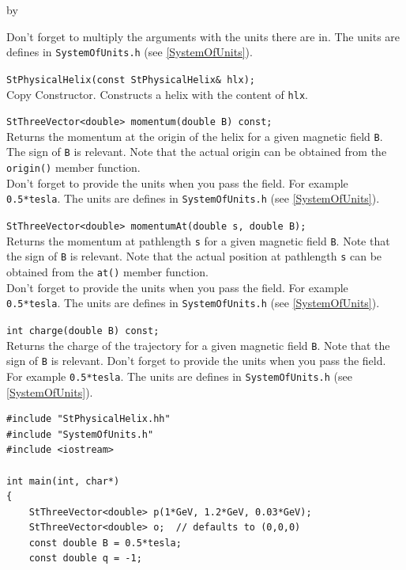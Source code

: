 \documentclass[twoside]{article}
\newcommand{\comp}[1]{\texttt{#1}}%
\newcommand{\entrylabel}[1]{\mbox{\textbf{{#1}}}\hfil}%
\newenvironment{entry}
{\begin{list}{}%
    {\renewcommand{\makelabel}{\entrylabel}%
     \setlength{\labelwidth}{90pt}%
     \setlength{\leftmargin}{\labelwidth}
     \advance\leftmargin by \labelsep%
      }%
    }%
  {\end{list}}
\newcommand{\Entrylabel}[1]%
{\raisebox{0pt}[1ex][0pt]{\makebox[\labelwidth][l]%
    {\parbox[t]{\labelwidth}{\hspace{0pt}\textbf{{#1}}}}}}
\newenvironment{Entry}%
{\renewcommand{\entrylabel}{\Entrylabel}\begin{entry}}%
  {\end{entry}}
\begin{document}
\begin{Entry}
    Don't forget to multiply the arguments with the units there are
    in. The units are defines in \texttt{SystemOfUnits.h}
    (see \ref{SystemOfUnits}).
    
    \verb+StPhysicalHelix(const StPhysicalHelix& hlx);+\\
    Copy Constructor. Constructs a helix with the content of \comp{hlx}.
            
\item[Public Member\\ Functions]
    \verb+StThreeVector<double> momentum(double B) const;+\\
    Returns the momentum at the origin of the helix for a given magnetic
    field \comp{B}. The sign of \comp{B} is relevant.
    Note that the actual origin can be obtained from the 
    \comp{origin()} member function.\\
    Don't forget to provide the units when you pass the field. For example
    \texttt{0.5*tesla}. The units are defines in \texttt{SystemOfUnits.h}
    (see \ref{SystemOfUnits}).

    \verb+StThreeVector<double> momentumAt(double s, double B);+\\
    Returns the momentum at pathlength \comp{s} for a given magnetic
    field \comp{B}. Note that the sign of \comp{B} is relevant.
    Note that the actual position at pathlength \comp{s} can be
    obtained from the \comp{at()} member function.\\
    Don't forget to provide the units when you pass the field. For example
    \texttt{0.5*tesla}. The units are defines in \texttt{SystemOfUnits.h}
    (see \ref{SystemOfUnits}).
    
    \verb+int charge(double B) const;+\\
    Returns the charge of the trajectory for a given magnetic
    field \comp{B}. Note that the sign of \comp{B} is relevant.
    Don't forget to provide the units when you pass the field. For example
    \texttt{0.5*tesla}. The units are defines in \texttt{SystemOfUnits.h}
    (see \ref{SystemOfUnits}).
    
\item[Examples]
{\footnotesize
\begin{verbatim}
#include "StPhysicalHelix.hh"
#include "SystemOfUnits.h"
#include <iostream>

int main(int, char*)
{
    StThreeVector<double> p(1*GeV, 1.2*GeV, 0.03*GeV);
    StThreeVector<double> o;  // defaults to (0,0,0)
    const double B = 0.5*tesla;
    const double q = -1;


\end{verbatim}}
\end{Entry}
\end{document}
